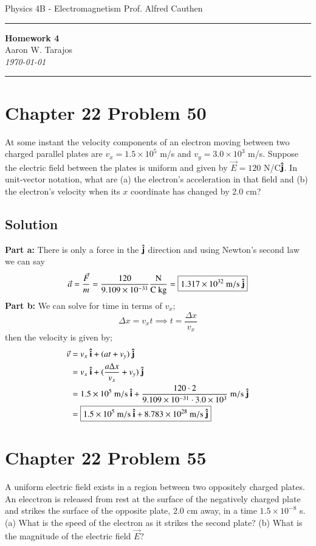 \documentclass{article}
\newcommand{\g}{\text{g}}
\newcommand{\kilo}{\text{k}}
\newcommand{\m}{\text{m}}
\newcommand{\s}{\text{s}}
\newcommand{\N}{\text{N}}
\newcommand{\C}{\text{C}}
\begin{document}
\noindent
Physics 4B - Electromagnetism \hfill Prof. Alfred Cauthen

\noindent\rule{\textwidth}{0.4pt}

\begin{center}
    \textbf{\LARGE Homework 4} \\
    \vspace{12pt}
    \large Aaron W. Tarajos \\
    \textit{\today}
\end{center}

\noindent\rule{\textwidth}{0.4pt}

\section*{Chapter 22 Problem 50}
At some instant the velocity components of an electron moving between two charged parallel plates are $v_x=1.5 \times 10^5$ m/s and $v_y = 3.0 \times 10^3$ m/s. Suppose the electric field between the plates is uniform and given by $\vec{E} = 120$ N/C$\vu j$. In unit-vector notation, what are (a) the electron's acceleration in that field and (b) the electron's velocity when its $x$ coordinate has changed by 2.0 cm?

\subsection*{Solution}
\textbf{Part a:} There is only a force in the $\vu j$ direction and using Newton's second law we can say
\[
	\vec a = \frac{\vec F}{m} = \frac{120}{9.109 \times 10^{-31}} \frac{\N}{\C\ \kilo\g} = \boxed{1.317\times10^{32}\ \m/\s \ \vu j} 
\]
\textbf{Part b:} We can solve for time in terms of $v_x$;
\[
	\Delta x = v_xt \implies t = \frac{\Delta x}{v_x}
\]
then the velocity is given by;
\begin{align*}
	\vec v &= v_x\ \vu i + (at + v_y)\ \vu j \\
		   &= v_x\ \vu i + (\frac{a\Delta x}{v_x} + v_y)\ \vu j \\
		   &= 1.5 \times 10^5\ \m/\s \ \vu i + \frac{120 \cdot 2}{9.109 \times 10^{-31} \cdot 3.0 \times 10^3}\ \m/\s \ \vu j \\
		   &= \boxed{1.5 \times 10^5\ \m/\s \ \vu i + 8.783 \times 10^{28}\ \m/\s \ \vu j}
\end{align*}

\section*{Chapter 22 Problem 55}
A uniform electric field exists in a region between two oppositely charged plates. An elecctron is released from rest at the surface of the negatively charged plate and strikes the surface of the opposite plate, 2.0 cm away, in a time $1.5 \times 10^{-8}$ s. (a) What is the speed of the electron as it strikes the second plate? (b) What is the magnitude of the electric field $\vec{E}$?
\end{document}

